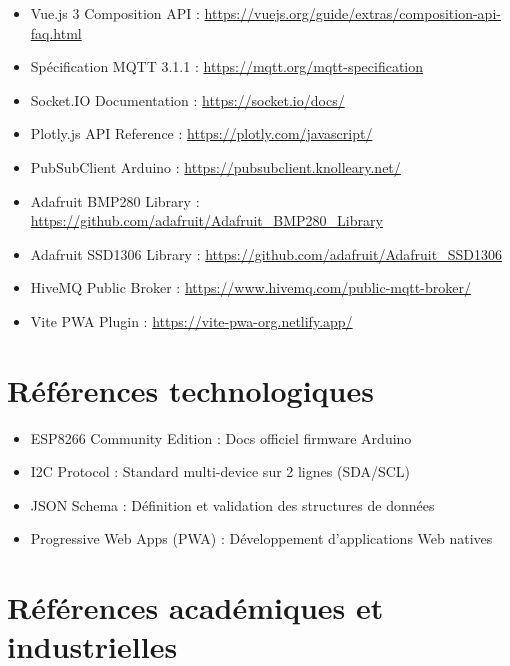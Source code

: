 \documentclass[12pt, a4paper]{report}
\begin{document}
\begin{itemize}[leftmargin=1.5cm, itemsep=5pt]
  \item Vue.js 3 Composition API :
        \url{https://vuejs.org/guide/extras/composition-api-faq.html}
  \item Sp\'ecification MQTT 3.1.1 :
        \url{https://mqtt.org/mqtt-specification}
  \item Socket.IO Documentation :
        \url{https://socket.io/docs/}
  \item Plotly.js API Reference :
        \url{https://plotly.com/javascript/}
  \item PubSubClient Arduino :
        \url{https://pubsubclient.knolleary.net/}
  \item Adafruit BMP280 Library :
        \url{https://github.com/adafruit/Adafruit_BMP280_Library}
  \item Adafruit SSD1306 Library :
        \url{https://github.com/adafruit/Adafruit_SSD1306}
  \item HiveMQ Public Broker :
        \url{https://www.hivemq.com/public-mqtt-broker/}
  \item Vite PWA Plugin :
        \url{https://vite-pwa-org.netlify.app/}
\end{itemize}

\section{R\'ef\'erences technologiques}

\begin{itemize}[leftmargin=1.5cm, itemsep=5pt]
  \item ESP8266 Community Edition : Docs officiel firmware Arduino
  \item I2C Protocol : Standard multi-device sur 2 lignes (SDA/SCL)
  \item JSON Schema : D\'efinition et validation des structures de donn\'ees
  \item Progressive Web Apps (PWA) : D\'eveloppement d'applications Web
        natives
\end{itemize}

\section{R\'ef\'erences acad\'emiques et industrielles}
\end{document}
